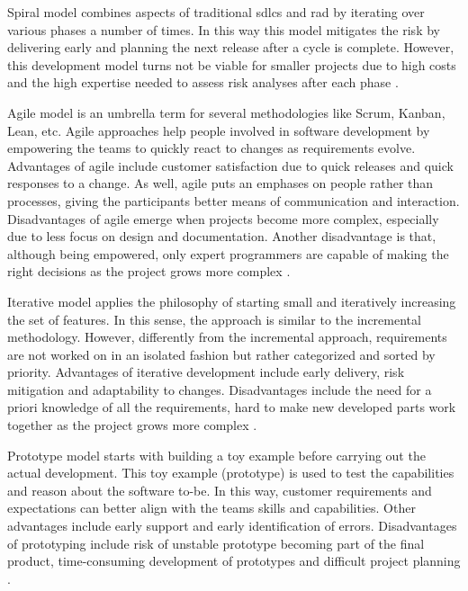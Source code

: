 Spiral model \citep{DBLP:journals/computer/Boehm88} combines aspects of traditional \glspl{sdlc} and \gls{rad} by iterating over various phases a number of times. In this way this model mitigates the risk by delivering early and planning the next release after a cycle is complete. However, this development model turns not be viable for smaller projects due to high costs and the high expertise needed to assess risk analyses after each phase \citep{sarker2015survey}.

Agile model \citep{beck2001manifesto} is an umbrella term for several methodologies like Scrum, Kanban, Lean, etc. Agile approaches help people involved in software development by empowering the teams to quickly react to changes as requirements evolve. Advantages of agile include customer satisfaction due to quick releases and quick responses to a change. As well, agile puts an emphases on people rather than processes, giving the participants better means of communication and interaction. Disadvantages of agile emerge when projects become more complex, especially due to less focus on design and documentation. Another disadvantage is that, although being empowered, only expert programmers are capable of making the right decisions as the project grows more complex \citep{DBLP:journals/jss/DingsoyrNBM12}.

Iterative model \citep{goldberg1995succeeding} applies the philosophy of starting small and iteratively increasing the set of features. In this sense, the approach is similar to the incremental methodology. However, differently from the incremental approach, requirements are not worked on in an isolated fashion but rather categorized and sorted by priority. Advantages of iterative development include early delivery, risk mitigation and adaptability to changes. Disadvantages include the need for a priori knowledge of all the requirements, hard to make new developed parts work together as the project grows more complex \citep{benediktsson2003cocomo}.


Prototype model \citep{pressman2005software} starts with building a toy example before carrying out the actual development. This toy example (prototype) is used to test the capabilities and reason about the software to-be. In this way, customer requirements and expectations can better align with the teams skills and capabilities. Other advantages include early support and early identification of errors. Disadvantages of prototyping include risk of unstable prototype becoming part of the final product, time-consuming development of prototypes and difficult project planning \citep{DBLP:conf/cicsyn/OsmaniAI14}. 

